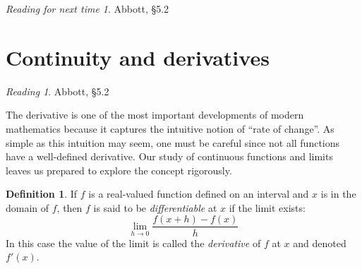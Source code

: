 \documentclass[11pt,oneside]{amsbook}
\theoremstyle{definition}
\newtheorem{exerc}{Exercise}[section]
\theoremstyle{plain}
\theoremstyle{definition}
\newtheorem{definition}[theorem]{Definition}
\theoremstyle{remark}
\newtheorem*{reading}{Reading}
\newtheorem*{readnext}{Reading for next time}
\numberwithin{equation}{section}
\numberwithin{figure}{section}
\begin{document}
%
%
%



\begin{readnext}
  Abbott, \S 5.2
\end{readnext}

\newpage
\section{Continuity and derivatives}

\begin{reading}
  Abbott, \S 5.2
\end{reading}

The derivative is one of the most important developments of modern mathematics because it captures the intuitive notion of ``rate of change''. As simple as this intuition may seem, one must be careful since not all functions have a well-defined derivative. Our study of continuous functions and limits leaves us prepared to explore the concept rigorously.

\begin{definition}
If $f$ is a real-valued function defined on an interval and $x$ is in the domain of $f$, then $f$ is said to be \emph{differentiable} at $x$ if the limit exists:
\[\lim_{h\to0}\frac{f(x+h)-f(x)}{h}
\]
In this case the value of the limit is called the \emph{derivative} of $f$ at $x$ and denoted $f'(x)$.
\end{definition}
\end{document}
